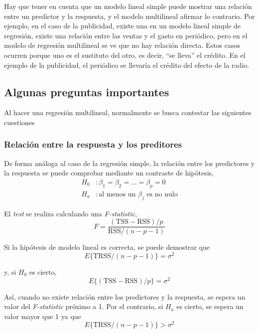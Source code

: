 Hay que tener en cuenta que un modelo lineal simple puede mostrar una relación entre un predictor y la respuesta, y el modelo multilineal afirmar lo contrario. Por ejemplo, en el caso de la publicidad, existe una en un modelo lineal simple de regresión, existe una relación entre las ventas y el gasto en periódico, pero en el modelo de regresión multilineal se ve que no hay relación directa. Estos casos ocurren porque uno es el sustituto del otro, es decir, ``se lleva'' el crédito. En el ejemplo de la publicidad, el periódico se llevaría el crédito del efecto de la radio. 

\subsection{Algunas preguntas importantes}

Al hacer una regresión multilineal, normalmente se busca contestar las siguientes cuestiones

\subsubsection{Relación entre la respuesta y los preditores}

De forma análoga al caso de la regresión simple, la relación entre los predictores y la respuesta se puede comprobar mediante un contraste de hipótesis, 
\begin{align}
H_0 &: \beta_1 = \beta_2 = \dots = \beta_p = 0 \\
H_a &: \text{al menos un } \beta_j \text{ es no nulo}
\end{align}

\noindent El \textit{test} se realiza calculando una \textit{F-statistic}, 
\begin{equation}
F = \frac{(\text{TSS} - \text{RSS})/p}{\text{RSS}/(n - p - 1)}
\label{eq:3.23}
\end{equation}

\noindent Si la hipótesis de modelo lineal es correcta, se puede demostrar que 
\begin{equation}
E\{\text{TRSS}/(n - p - 1)\} = \sigma^2
\end{equation}

\noindent y, si $H_0$ es cierto, 
\begin{equation}
E\{(\text{TSS} - \text{RSS})/p\} = \sigma^2 
\end{equation}

Así, cuando no existe relación entre los predictores y la respuesta, se espera un valor del \textit{F-statistic} próximo a 1. Por el contrario, si $H_a$ es cierto, se espera un valor mayor que 1 ya que 
\begin{equation}
E\{\text{TRSS}/(n - p - 1)\} > \sigma^2
\end{equation}

